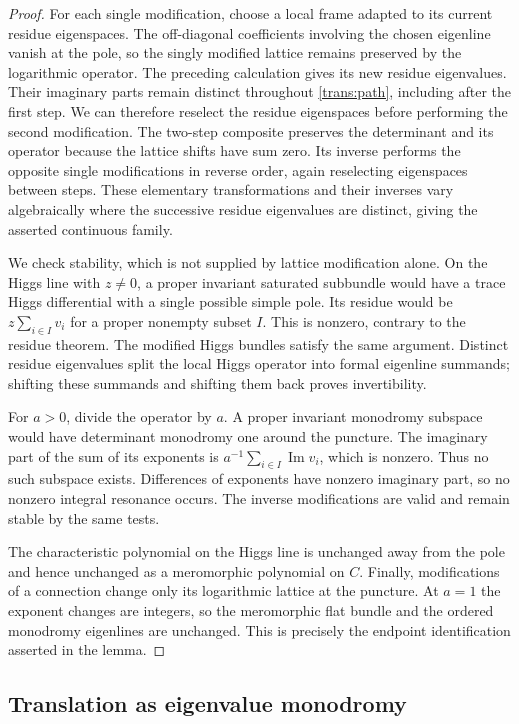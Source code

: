 \begin{proof}
For each single modification, choose a local frame adapted to its current
residue eigenspaces. The off-diagonal coefficients involving the chosen
eigenline vanish at the pole, so the singly modified lattice remains
preserved by the logarithmic operator. The preceding calculation gives its
new residue eigenvalues. Their imaginary parts remain distinct throughout
\eqref{trans:path}, including after the first step. We can therefore
reselect the residue eigenspaces before performing the second modification.
The two-step composite preserves the determinant and its operator because
the lattice shifts have sum zero. Its inverse performs the opposite
single modifications in reverse order, again reselecting eigenspaces
between steps. These elementary transformations and their inverses vary
algebraically where the successive residue eigenvalues are distinct,
giving the asserted continuous family.

We check stability, which is not supplied by lattice modification alone. On the Higgs line with $z\ne0$, a proper invariant saturated subbundle would have a trace Higgs differential with a single possible simple pole. Its residue would be $z\sum_{i\in I}v_i$ for a proper nonempty subset $I$. This is nonzero, contrary to the residue theorem. The modified Higgs bundles satisfy the same argument. Distinct residue eigenvalues split the local Higgs operator into formal eigenline summands; shifting these summands and shifting them back proves invertibility.

For $a>0$, divide the operator by $a$. A proper invariant monodromy subspace would have determinant monodromy one around the puncture. The imaginary part of the sum of its exponents is $a^{-1}\sum_{i\in I}\operatorname{Im}v_i$, which is nonzero. Thus no such subspace exists. Differences of exponents have nonzero imaginary part, so no nonzero integral resonance occurs. The inverse modifications are valid and remain stable by the same tests.

The characteristic polynomial on the Higgs line is unchanged away from the pole and hence unchanged as a meromorphic polynomial on $C$. Finally, modifications of a connection change only its logarithmic lattice at the puncture. At $a=1$ the exponent changes are integers, so the meromorphic flat bundle and the ordered monodromy eigenlines are unchanged. This is precisely the endpoint identification asserted in the lemma.
\end{proof}

\subsection{Translation as eigenvalue monodromy}

